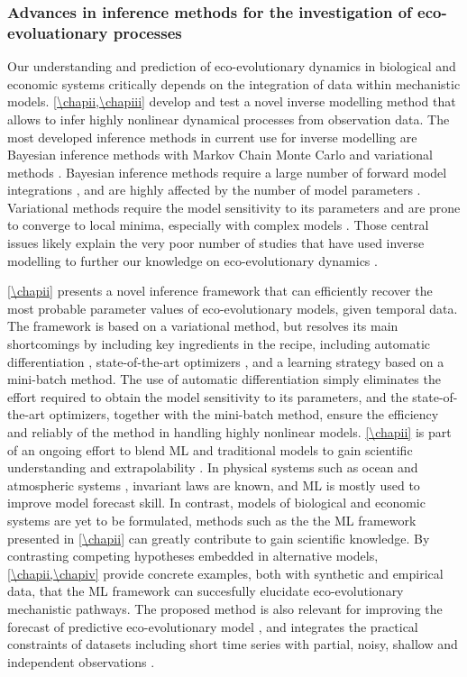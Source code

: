 \subsubsection{Advances in inference methods for the investigation of eco-evoluationary processes}

Our understanding and prediction of eco-evolutionary dynamics in biological and economic systems critically depends on the integration of data within mechanistic models.
% 
\cref{\chapii,\chapiii} develop and test a novel inverse modelling method that allows to infer highly nonlinear dynamical processes from observation data.
% 
The most developed inference methods in current use for inverse modelling are Bayesian inference methods with Markov Chain Monte Carlo \xxx and variational methods \xxx.
% 
% 
Bayesian inference methods require a large number of forward model integrations \citep{Schneider2017}, and are highly affected by the number of model parameters \citep{Csillery2010}.
% 
Variational methods require the model sensitivity to its parameters \xxx and are prone to converge to local minima, especially with complex models \citep{XXX}.
% 
Those central issues likely explain the very poor number of studies that have used inverse modelling to further our knowledge on eco-evolutionary dynamics \xxx. 
% 

%
\cref{\chapii} presents a novel inference framework that can efficiently recover the most probable parameter values of eco-evolutionary models, given temporal data.
% 
The framework is based on a variational method, but resolves its main shortcomings by including key ingredients in the recipe, including automatic differentiation \citep{Rackauckas2020a}, state-of-the-art optimizers \citep{Kingma2014}, and a learning strategy based on a mini-batch method. 
% 
The use of automatic differentiation simply eliminates the effort required to obtain the model sensitivity to its parameters, and the state-of-the-art optimizers, together with the mini-batch method, ensure the efficiency and reliably of the method in handling highly nonlinear models.
% 
\cref{\chapii} is part of an ongoing effort to blend ML and traditional models to gain scientific understanding and extrapolability \citep{XXX}. 
% 
In physical systems such as ocean and atmospheric systems \xxx, invariant laws are known, and ML is mostly used to improve model forecast skill. In contrast, models of biological and economic systems are yet to be formulated, methods such as the the ML framework presented in \cref{\chapii}  can greatly contribute to gain scientific knowledge. 
% 
By contrasting competing hypotheses embedded in alternative models, \cref{\chapii,\chapiv} provide concrete examples, both with synthetic and empirical data, that the ML framework can succesfully elucidate eco-evolutionary mechanistic pathways.
The proposed method is also relevant for improving the forecast of predictive eco-evolutionary model \cite{Urban2016}, and integrates the practical constraints of datasets including short time series with partial, noisy, shallow and independent observations \citep{Dornelas2018}.

